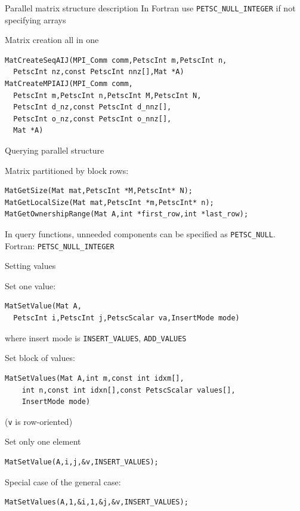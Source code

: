 \begin{longstory}
\begin{numberedframe}{Parallel matrix structure description}
In Fortran use \lstinline{PETSC_NULL_INTEGER} if not specifying arrays
\end{numberedframe}

\begin{details}
\begin{numberedframe}{Matrix creation all in one}
\begin{lstlisting}
MatCreateSeqAIJ(MPI_Comm comm,PetscInt m,PetscInt n,
  PetscInt nz,const PetscInt nnz[],Mat *A)
MatCreateMPIAIJ(MPI_Comm comm,
  PetscInt m,PetscInt n,PetscInt M,PetscInt N,
  PetscInt d_nz,const PetscInt d_nnz[],
  PetscInt o_nz,const PetscInt o_nnz[],
  Mat *A)
\end{lstlisting}
\end{numberedframe}

\end{details}

\begin{numberedframe}{Querying parallel structure}

Matrix partitioned by block rows:
\begin{lstlisting}
MatGetSize(Mat mat,PetscInt *M,PetscInt* N);
MatGetLocalSize(Mat mat,PetscInt *m,PetscInt* n);
MatGetOwnershipRange(Mat A,int *first_row,int *last_row);
\end{lstlisting}
 In query functions, unneeded components can be specified as
 \lstinline{PETSC_NULL}.\\
 Fortran: \lstinline{PETSC_NULL_INTEGER}
\end{numberedframe}

\begin{numberedframe}{Setting values}

Set one value:
\begin{lstlisting}
MatSetValue(Mat A,
  PetscInt i,PetscInt j,PetscScalar va,InsertMode mode)
\end{lstlisting}
where insert mode is \lstinline{INSERT_VALUES}, \lstinline{ADD_VALUES}

Set block of values:
\begin{lstlisting}
MatSetValues(Mat A,int m,const int idxm[],
    int n,const int idxn[],const PetscScalar values[],
    InsertMode mode)
\end{lstlisting}
(\lstinline{v} is row-oriented)
\end{numberedframe}

\begin{numberedframe}{Set only one element}
\begin{lstlisting}
MatSetValue(A,i,j,&v,INSERT_VALUES);
\end{lstlisting}
Special case of the general case:
\begin{lstlisting}
MatSetValues(A,1,&i,1,&j,&v,INSERT_VALUES);
\end{lstlisting}
\end{numberedframe}


\end{longstory}
